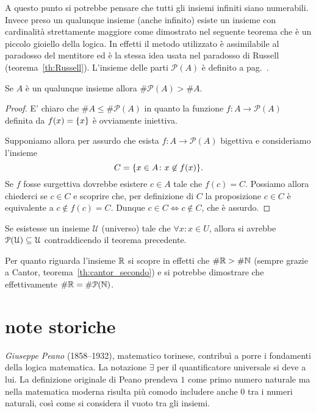 A questo punto si potrebbe pensare che
tutti gli insiemi infiniti siano numerabili.
Invece preso un qualunque insieme (anche infinito)
esiste un insieme con cardinalità strettamente maggiore
come dimostrato nel seguente teorema che è un piccolo gioiello della logica.
In effetti il metodo utilizzato è assimilabile al paradosso del mentitore 
ed è la stessa idea usata nel paradosso di Russell (teorema~\ref{th:Russell}).
L'insieme delle parti $\mathcal P(A)$ è definito a pag.~\pageref{def:insieme_parti}.
%
\begin{theorem}[Cantor]%
\label{th:Cantor}%
  Se $A$ è un qualunque insieme allora $\# \mathcal P(A) > \# A$.
\end{theorem}
%
\begin{proof}
  E' chiaro che $\# A \le \#\mathcal P(A)$ in quanto 
  la funzione $f\colon A \to \mathcal P(A)$ definita da $f(x)=\ENCLOSE{x}$
  è ovviamente iniettiva.

  Supponiamo allora per assurdo che esista $f\colon A\to \mathcal P(A)$
  bigettiva e consideriamo l'insieme 
  \[
    C = \ENCLOSE{x\in A \colon x\not\in f(x)}.  
  \]
  Se $f$ fosse surgettiva dovrebbe esistere $c\in A$ tale che $f(c) = C$.
  Possiamo allora chiederci se $c\in C$ e scoprire che, 
  per definizione di $C$ la proposizione $c\in C$ è equivalente 
  a $c\not\in f(c) = C$. 
  Dunque $c\in C \iff c\not\in C$, che è assurdo.
\end{proof}
%
\begin{corollary}
  Se esistesse un insieme $\mathcal U$ (universo) 
  tale che $\forall x\colon x \in U$, allora 
  si avrebbe $\mathcal \P(\mathcal U) \subset \mathcal U$
  contraddicendo il teorema precedente.
\end{corollary}
%
Per quanto riguarda l'insieme $\RR$ si
scopre in effetti che $\#\RR > \#\NN$
(sempre grazie a Cantor, teorema~\ref{th:cantor_secondo})
e si potrebbe dimostrare che effettivamente $\#\RR = \#\mathcal P(\NN)$.

\section{note storiche}

\label{nota:Peano}%
%
\emph{Giuseppe Peano} (1858--1932), matematico torinese, contribuì a porre 
i fondamenti della logica matematica. 
La notazione $\exists$ per il quantificatore universale si deve a lui.
La definizione originale di Peano prendeva $1$ come primo numero
naturale ma nella matematica moderna risulta più comodo includere anche $0$ 
tra i numeri naturali, così come si considera il vuoto tra gli insiemi.


